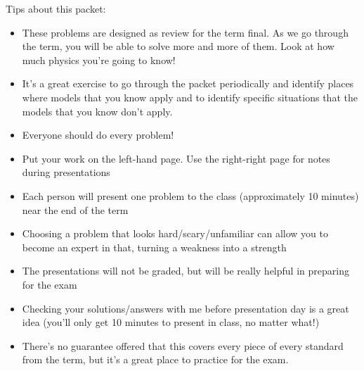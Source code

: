 


\bigskip
{\large Tips about this packet:
\begin{itemize} \itemsep1pt \parskip0pt  
\renewcommand{\labelitemi}{$\rightarrow$}
\item These problems are designed as review for the term final. As we go through the term, you will be able to solve more and more of them.  Look at how much physics you're going to know! 
\item It's a great exercise to go through the packet periodically and identify places where models that you know apply and to identify specific situations that the models that you know don't apply.
\item Everyone should do every problem!
\item Put your work on the left-hand page. Use the right-right page for notes during presentations
\item Each person will present one problem to the class (approximately 10 minutes) near the end of the term
\item Choosing a problem that looks hard/scary/unfamiliar can allow you to become an expert in that, turning a weakness into a strength
\item The presentations will not be graded, but will be really helpful in preparing for the exam
\item Checking your solutions/answers with me before presentation day is a great idea (you'll only get 10 minutes to present in class, no matter what!)
\item There's no guarantee offered that this covers every piece of every standard from the term, but it's a great place to practice for the exam.
\end{itemize}}

\newpage
